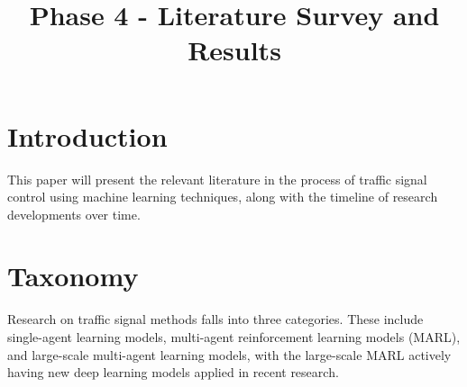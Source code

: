 \documentclass[conference]{IEEEtran}
\begin{document}
\title{Phase 4 - Literature Survey and Results\\}

\author{
\and  
{}  
\and
{}  
\and
{}  
}

\maketitle

\section{Introduction}
This paper will present the relevant literature in the process of traffic signal control using machine learning techniques, along with the timeline of research developments over time.  

\section{Taxonomy}

Research on traffic signal methods falls into three categories. These include single-agent learning models, multi-agent reinforcement learning models (MARL), and large-scale multi-agent learning models, with the large-scale MARL actively having new deep learning models applied in recent research. 
\end{document}
